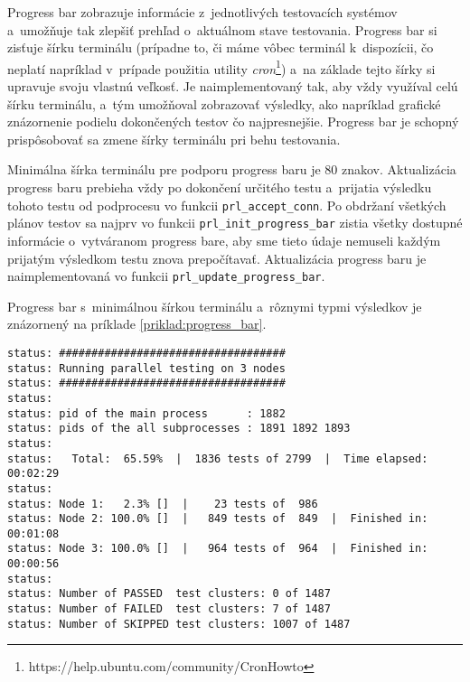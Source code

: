 Progress bar zobrazuje informácie z~jednotlivých testovacích systémov 
a~umožňuje tak zlepšiť prehľad o~aktuálnom stave testovania. 
Progress bar si zisťuje šírku terminálu (prípadne to, či máme vôbec 
terminál k~dispozícii, čo neplatí napríklad v~prípade použitia utility 
\textit{cron}\footnote{https://help.ubuntu.com/community/CronHowto}) 
a~na základe tejto šírky si upravuje svoju vlastnú veľkosť.
Je naimplementovaný tak, aby vždy využíval celú šírku terminálu, a~tým
umožňoval zobrazovať výsledky, ako napríklad grafické znázornenie podielu
dokončených testov čo najpresnejšie. Progress bar je schopný prispôsobovať
sa zmene šírky terminálu pri behu testovania.

Minimálna šírka terminálu pre podporu progress baru je 80 znakov.
Aktualizácia progress baru prebieha vždy po dokončení určitého testu
a~prijatia výsledku tohoto testu od podprocesu vo funkcii
\texttt{prl\_accept\_conn}. Po obdržaní všetkých plánov testov sa najprv 
vo funkcii \texttt{prl\_init\_progress\_bar} zistia všetky dostupné
informácie o~vytváranom progress bare, aby sme tieto údaje nemuseli 
každým prijatým výsledkom testu znova prepočítavať.
Aktualizácia progress baru je naimplementovaná vo funkcii 
\texttt{prl\_update\_progress\_bar}.

Progress bar s~minimálnou šírkou terminálu a~rôznymi 
typmi výsledkov je znázornený na príklade
\ref{priklad:progress_bar}.

\noindent\begin{minipage}{\textwidth}
\begin{lstlisting}[caption=Ukážka progress baru so šírkou terminálu 
80 znakov,label=priklad:progress_bar]
status: ###################################
status: Running parallel testing on 3 nodes
status: ###################################
status: 
status: pid of the main process      : 1882
status: pids of the all subprocesses : 1891 1892 1893
status: 
status:   Total:  65.59%  |  1836 tests of 2799  |  Time elapsed: 00:02:29      
status:                                                                         
status: Node 1:   2.3% []  |    23 tests of  986                                
status: Node 2: 100.0% []  |   849 tests of  849  |  Finished in: 00:01:08      
status: Node 3: 100.0% []  |   964 tests of  964  |  Finished in: 00:00:56      
status:                                                                         
status: Number of PASSED  test clusters: 0 of 1487                              
status: Number of FAILED  test clusters: 7 of 1487                              
status: Number of SKIPPED test clusters: 1007 of 1487
\end{lstlisting}
\end{minipage}


